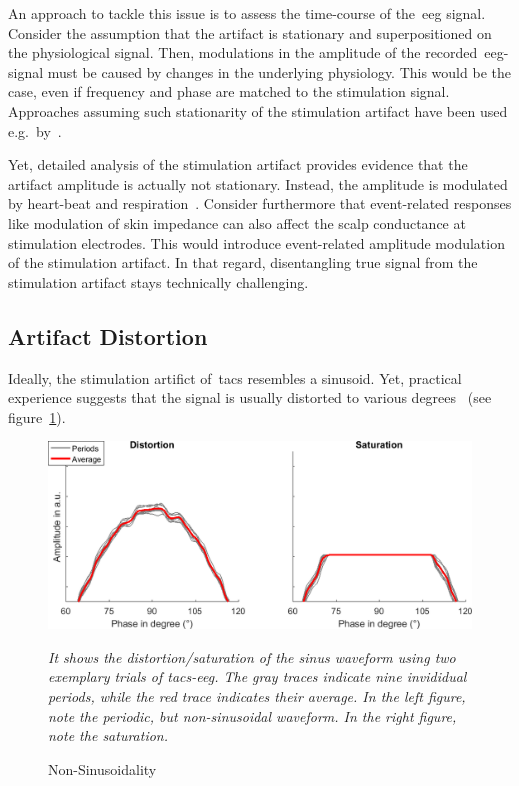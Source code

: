 \documentclass[a4paper]{article}
\newcommand{\figleg}[1]{\centering\itshape{#1}\/}
\newcommand{\figref}[1]{ (see figure~\ref{#1})}
\begin{document}
An approach to tackle this issue is to assess the time-course of the~\gls{eeg} signal. Consider the assumption that the artifact is stationary and superpositioned on the physiological signal. Then, modulations in the amplitude of the recorded~\gls{eeg}-signal must be caused by changes in the underlying physiology.
This would be the case, even if frequency and phase are matched to the stimulation signal. Approaches assuming such stationarity of the stimulation artifact have been used e.g.\ by~\cite{Pogosyan_2009}.

Yet, detailed analysis of the stimulation artifact provides evidence that the artifact amplitude is actually not stationary. Instead, the amplitude is modulated by heart-beat and respiration~\citep{Noury_2016}.
Consider furthermore that event-related responses like modulation of skin impedance can also affect the scalp conductance at stimulation electrodes. This would introduce event-related amplitude modulation of the stimulation artifact. In that regard, disentangling true signal from the stimulation artifact stays technically challenging.

\subsection{Artifact Distortion}

Ideally, the stimulation artifict of~\gls{tacs} resembles a sinusoid. Yet, practical experience suggests that the signal is usually distorted to various degrees~\figref{fig:nonsinus}.

\begin{figure}[hbtp]
    \includegraphics[width=\textwidth]{./img/non_sinusoidality.png}
    \caption{Non-Sinusoidality}
    \figleg{It shows the distortion/saturation of the sinus waveform using two exemplary trials of \gls{tacs}-\gls{eeg}. The gray traces indicate nine invididual periods, while the red trace indicates their average. In the left figure, note the periodic, but non-sinusoidal waveform. In the right figure, note the saturation.}\label{fig:nonsinus}
\end{figure}
\end{document}

